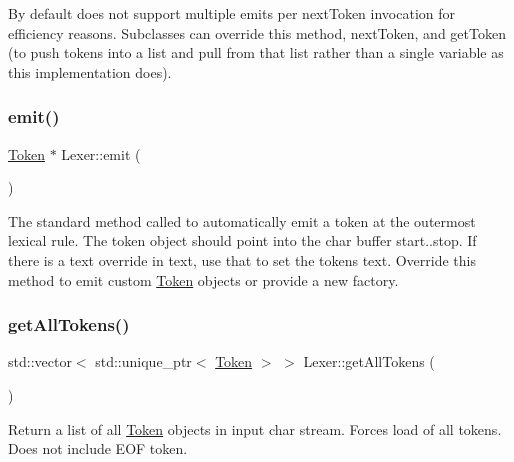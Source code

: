 By default does not support multiple emits per next\+Token invocation for efficiency reasons. Subclasses can override this method, next\+Token, and get\+Token (to push tokens into a list and pull from that list rather than a single variable as this implementation does). \mbox{\label{classantlr4_1_1Lexer_abc214e5f1f83f7eb144faa12a5b8e900}} 
\subsubsection{\texorpdfstring{emit()}{emit()}\hspace{0.1cm}{\footnotesize\ttfamily [2/2]}}
{\footnotesize\ttfamily \hyperlink{classantlr4_1_1Token}{Token} $\ast$ Lexer\+::emit (\begin{DoxyParamCaption}{ }\end{DoxyParamCaption})\hspace{0.3cm}{\ttfamily [virtual]}}

The standard method called to automatically emit a token at the outermost lexical rule. The token object should point into the char buffer start..stop. If there is a text override in \textquotesingle{}text\textquotesingle{}, use that to set the token\textquotesingle{}s text. Override this method to emit custom \hyperlink{classantlr4_1_1Token}{Token} objects or provide a new factory. \mbox{\label{classantlr4_1_1Lexer_a113a0f0bdb864c0137f173a6c441f363}} 
\subsubsection{\texorpdfstring{get\+All\+Tokens()}{getAllTokens()}}
{\footnotesize\ttfamily std\+::vector$<$ std\+::unique\+\_\+ptr$<$ \hyperlink{classantlr4_1_1Token}{Token} $>$ $>$ Lexer\+::get\+All\+Tokens (\begin{DoxyParamCaption}{ }\end{DoxyParamCaption})\hspace{0.3cm}{\ttfamily [virtual]}}

Return a list of all \hyperlink{classantlr4_1_1Token}{Token} objects in input char stream. Forces load of all tokens. Does not include E\+OF token. \mbox{\label{classantlr4_1_1Lexer_a6f2437c9681598c4d9475cb8a91bb2c0}} 
